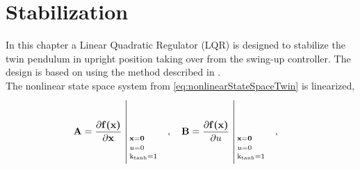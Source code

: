%
\chapter{Stabilization}
%
%
In this chapter a Linear Quadratic Regulator (LQR) is designed to stabilize the twin pendulum in upright position taking over from the swing-up controller. The design is based on \cite{triantafyllou2003maneuvering, franklin1994feedback} using the method described in \cite{lqrd}.\\
The nonlinear state space system from \autoref{eq:nonlinearStateSpaceTwin} is linearized,
\begin{align}
  \vec{A} &= \frac{\partial \vec{f(x)}}{\partial \vec{x}} \whereThree{\vec{x}=\vec{0}\ \ \ \ }{u=0\ \ \ \ }{\text{k}_\text{tanh}=1} \ \ \ , \ \ \
  \vec{B} = \frac{\partial \vec{f(x)}}{\partial u}  \whereThree{\vec{x}=\vec{0}\ \ \ \ }{u=0\ \ \ \ }{\text{k}_\text{tanh}=1} \ \ \ ,
  \label{eq:linearTwin_AB}
\end{align}
